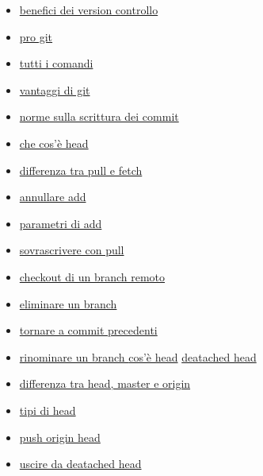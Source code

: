 \documentclass{article} \usepackage[textwidth=18cm,textheight=18cm]{geometry}
\begin{document}
\begin{itemize}
    \item \href{https://www.atlassian.com/git/tutorials/what-is-version-control}{benefici dei version controllo}
    \item \href{https://git-scm.com/book/en/v2}{pro git}
    \item \href{https://git-scm.com/doc}{tutti i comandi}
    \item \href{https://git-scm.com/about/branching-and-merging}{vantaggi di git}
    \item \href{https://chris.beams.io/posts/git-commit/}{norme sulla scrittura dei commit}
    \item \href{https://stackoverflow.com/questions/9529497/what-is-origin-in-git}{che cos'è head}
    \item \href{https://stackoverflow.com/questions/292357/what-is-the-difference-between-git-pull-and-git-fetch}{differenza tra pull e fetch}
    \item \href{https://stackoverflow.com/questions/348170/how-do-i-undo-git-add-before-commit?rq=1}{annullare add}
    \item \href{https://stackoverflow.com/questions/572549/difference-between-git-add-a-and-git-add?rq=1}{parametri di add}
    \item \href{https://stackoverflow.com/questions/1125968/how-do-i-force-git-pull-to-overwrite-local-files?rq=1}{sovrascrivere con pull}
    \item \href{https://stackoverflow.com/questions/1783405/how-do-i-check-out-a-remote-git-branch?rq=1}{checkout di un branch remoto}
    \item \href{https://stackoverflow.com/questions/2003505/how-do-i-delete-a-git-branch-locally-and-remotely?rq=1}{eliminare un branch}
    \item \href{https://stackoverflow.com/questions/4114095/how-do-i-revert-a-git-repository-to-a-previous-commit?rq=1}{tornare a commit precedenti}
    \item \href{https://stackoverflow.com/questions/6591213/how-do-i-rename-a-local-git-branch?rq=1}{rinominare un branch }
\href{https://stackoverflow.com/questions/2304087/what-is-head-in-git}{cos'è head}
\href{https://www.git-tower.com/learn/git/faq/detached-head-when-checkout-commit}{deatached head}
\item \href{https://stackoverflow.com/questions/8196544/what-are-the-git-concepts-of-head-master-origin}{differenza tra head, master e origin}
\item \href{https://stackoverflow.com/questions/20954566/what-is-the-difference-from-head-head-and-head1}{tipi di head}
\item \href{https://stackoverflow.com/questions/23241052/what-does-git-push-origin-head-mean}{push origin head}
\item \href{https://stackoverflow.com/questions/10228760/fix-a-git-detached-head}{uscire da deatached head}

\end{itemize}
\end{document}
